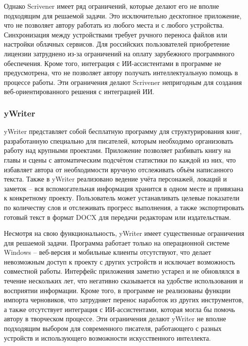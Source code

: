 Однако Scrivener имеет ряд ограничений, которые делают его не вполне подходящим для решаемой задачи. Это исключительно десктопное приложение, что не позволяет автору работать из любого места и с любого устройства. Синхронизация между устройствами требует ручного переноса файлов или настройки облачных сервисов. Для российских пользователей приобретение лицензии затруднено из-за ограничений на оплату зарубежного программного обеспечения. Кроме того, интеграция с ИИ-ассистентами в программе не предусмотрена, что не позволяет автору получать интеллектуальную помощь в процессе работы. Эти ограничения делают Scrivener непригодным для создания веб-ориентированного решения с интеграцией ИИ.

\subsubsection{yWriter}

yWriter представляет собой бесплатную программу для структурирования книг, разработанную специально для писателей, которым необходимо организовать работу над крупными проектами. Приложение позволяет разбивать книгу на главы и сцены с автоматическим подсчётом статистики по каждой из них, что избавляет автора от необходимости вручную отслеживать объём написанного текста. Также в yWriter реализовано ведение учёта персонажей, локаций и заметок -- вся вспомогательная информация хранится в одном месте и привязана к конкретному проекту. Пользователь может устанавливать целевые показатели по количеству слов и отслеживать прогресс выполнения, а также экспортировать готовый текст в формат DOCX для передачи редакторам или издательствам.

Несмотря на свою функциональность, yWriter имеет существенные ограничения для решаемой задачи. Программа работает только на операционной системе Windows -- веб-версия и мобильные клиенты отсутствуют, что делает невозможным доступ к проекту с других устройств и исключает возможность совместной работы. Интерфейс приложения заметно устарел и не обновлялся в течение нескольких лет, что негативно сказывается на удобстве использования и восприятии информации. Кроме того, в программе не реализованы функции импорта черновиков, что затрудняет перенос наработок из других инструментов, а также отсутствует интеграция с ИИ-ассистентами, которая могла бы помочь автору в творческом процессе. Эти ограничения делают yWriter не вполне подходящим выбором для современного писателя, работающего с разных устройств и использующего возможности искусственного интеллекта.

